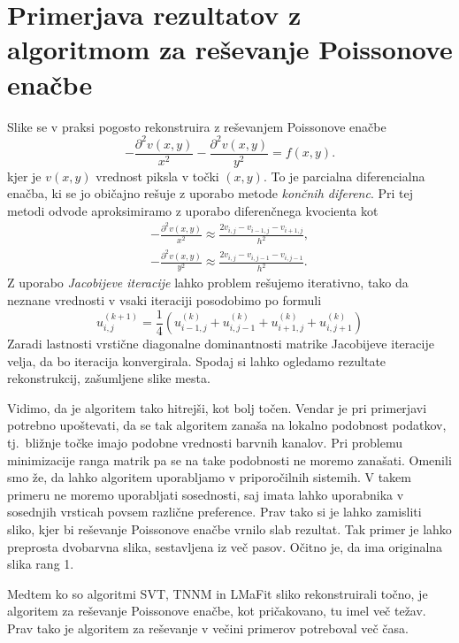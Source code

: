 \section{Primerjava rezultatov z algoritmom za reševanje Poissonove enačbe} \label{1307-2255}
 
Slike se v praksi pogosto rekonstruira z reševanjem Poissonove enačbe
\[
    -\frac{\partial^2v(x, y)}{x^2} - \frac{\partial^2v(x, y)}{y^2} = f(x,y).
\]
kjer je $v(x,y)$ vrednost piksla v točki $(x, y)$. To je parcialna diferencialna enačba, ki se jo običajno rešuje z uporabo metode \textit{končnih diferenc}. Pri tej metodi odvode aproksimiramo z uporabo diferenčnega kvocienta kot
\begin{align*}
    -\frac{\partial^2v(x, y)}{x^2} \approx \frac{2v_{i,j} - v_{i-1, j} - v_{i+1, j}}{h^2}, \\
    -\frac{\partial^2v(x, y)}{y^2} \approx \frac{2v_{i,j} - v_{i, j-1} - v_{i, j-1}}{h^2}.
\end{align*}
Z uporabo \textit{Jacobijeve iteracije} lahko problem rešujemo iterativno, tako da neznane vrednosti v vsaki iteraciji posodobimo po formuli
\[
    u_{i, j}^{(k+1)} = \frac{1}{4}(u_{i - 1, j}^{(k)} +  u_{i, j - 1}^{(k)} + u_{i + 1, j}^{(k)} + u_{i, j + 1}^{(k)})
\]
Zaradi lastnosti vrstične diagonalne dominantnosti matrike Jacobijeve iteracije velja, da bo iteracija konvergirala. Spodaj si lahko ogledamo rezultate rekonstrukcij, zašumljene slike mesta.

\FloatBarrier
Vidimo, da je algoritem tako hitrejši, kot bolj točen. Vendar je pri primerjavi potrebno upoštevati, da se tak algoritem zanaša na lokalno podobnost podatkov, tj.\ bližnje točke imajo podobne vrednosti barvnih kanalov. Pri problemu minimizacije ranga matrik pa se na take podobnosti ne moremo zanašati. Omenili smo že, da lahko algoritem uporabljamo v priporočilnih sistemih. V takem primeru ne moremo uporabljati sosednosti, saj imata lahko uporabnika v sosednjih vrsticah povsem različne preference. Prav tako si je lahko zamisliti sliko, kjer bi reševanje Poissonove enačbe vrnilo slab rezultat. Tak primer je lahko preprosta dvobarvna slika, sestavljena iz več pasov. Očitno je, da ima originalna slika rang 1.

Medtem ko so algoritmi SVT, TNNM in LMaFit sliko rekonstruirali točno, je algoritem za reševanje Poissonove enačbe, kot pričakovano, tu imel več težav. Prav tako je algoritem za reševanje v večini primerov potreboval več časa.